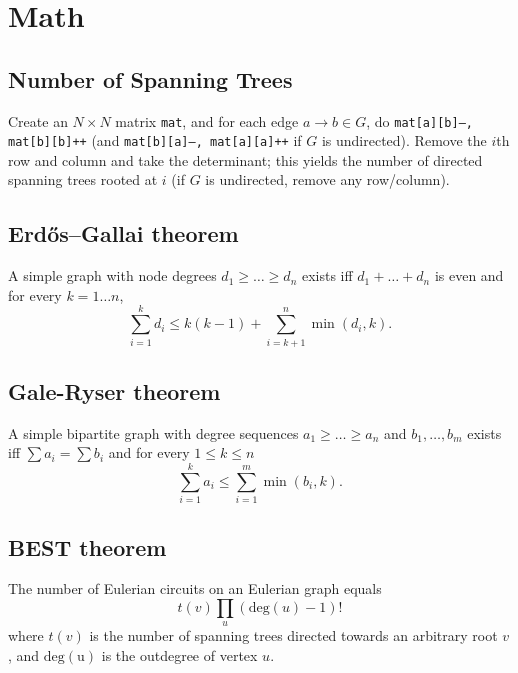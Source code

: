 \section{Math}
	\subsection{Number of Spanning Trees}
		Create an $N\times N$ matrix \texttt{mat}, and for each edge $a \rightarrow b \in G$, do
		\texttt{mat[a][b]--, mat[b][b]++} (and \texttt{mat[b][a]--, mat[a][a]++} if $G$ is undirected).
		Remove the $i$th row and column and take the determinant; this yields the number of directed spanning trees rooted at $i$
		(if $G$ is undirected, remove any row/column).

	\subsection{Erdős–Gallai theorem}
		A simple graph with node degrees $d_1 \ge \dots \ge d_n$ exists iff $d_1 + \dots + d_n$ is even and for every $k = 1\dots n$,
		\[ \sum _{i=1}^{k}d_{i}\leq k(k-1)+\sum _{i=k+1}^{n}\min(d_{i},k). \]

  \subsection{Gale-Ryser theorem}
    A simple bipartite graph with degree sequences $a_1 \geq \dots \geq a_n$
    and $b_1, \dots, b_m$ exists iff $\sum a_i = \sum b_i$ and for every
    $1 \leq k \leq n$
    \[ \sum_{i=1}^k a_i \leq \sum_{i=1}^m \min(b_i, k). \]

  \subsection{BEST theorem}
    The number of Eulerian circuits on an Eulerian graph equals
    \[ t(v) \prod_{u} (\mathrm{deg}(u) - 1)! \]
    where $t(v)$ is the number of spanning trees directed towards an arbitrary root $v$,
    and $\mathrm{deg(u)}$ is the outdegree of vertex $u$.
